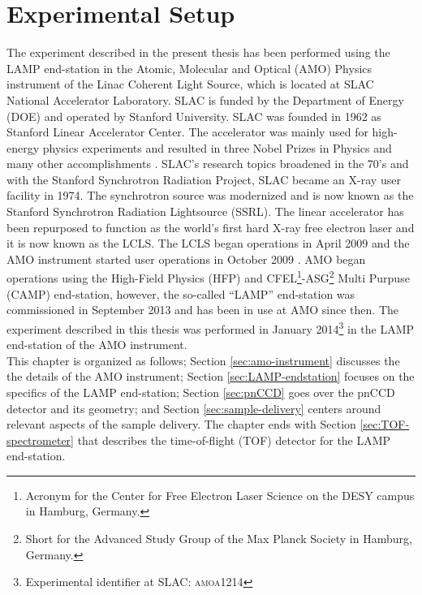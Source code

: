 \chapter{Experimental Setup}\label{ch:exp_setup}
The experiment described in the present thesis has been performed using the LAMP end-station in the Atomic, Molecular and Optical (AMO) Physics instrument of the Linac Coherent Light Source, which is located at SLAC National Accelerator Laboratory. SLAC is funded by the Department of Energy (DOE) and operated by Stanford University. SLAC was founded in 1962 as Stanford Linear Accelerator Center. The accelerator was mainly used for high-energy physics experiments and resulted in three Nobel Prizes in Physics \citep{Richter-PRL-1974,Taylor-SLAC-1967,Perl-PRL-1975} and many other accomplishments \citep{KELLEHER-1990-cell,Emma-2010-NatPho}. SLAC's research topics broadened in the 70's and with the Stanford Synchrotron Radiation Project, SLAC became an X-ray user facility in 1974. The synchrotron source was modernized and is now known as the Stanford Synchrotron Radiation Lightsource (SSRL). The linear accelerator has been repurposed to function as the world's first hard X-ray free electron laser and it is now known as the LCLS. The LCLS began operations in April 2009 \citep{Emma-2010-NatPho} and the AMO instrument started user operations in October 2009 \citep{Bostedt-2013-JPB}. AMO began operations using the High-Field Physics (HFP) and CFEL\footnote{Acronym for the Center for Free Electron Laser Science on the DESY campus in Hamburg, Germany.}-ASG\footnote{Short for the Advanced Study Group of the Max Planck Society in Hamburg, Germany.} Multi Purpuse (CAMP) end-station, however, the so-called ``LAMP'' end-station was commissioned in September 2013 and has been in use at AMO since then. The experiment described in this thesis was performed in January 2014\footnote{Experimental identifier at SLAC: \textsc{amoa1214}} in the LAMP end-station of the AMO instrument.\\[1\baselineskip]
%
This chapter is organized as follows; Section \ref{sec:amo-instrument} discusses the the details of the AMO instrument; Section \ref{sec:LAMP-endstation} focuses on the specifics of the LAMP end-station; Section \ref{sec:pnCCD} goes over the pnCCD detector and its geometry; and Section \ref{sec:sample-delivery} centers around relevant aspects of the sample delivery. The chapter ends with Section \ref{sec:TOF-spectrometer} that describes the time-of-flight (TOF) detector for the LAMP end-station.
%
%
%
